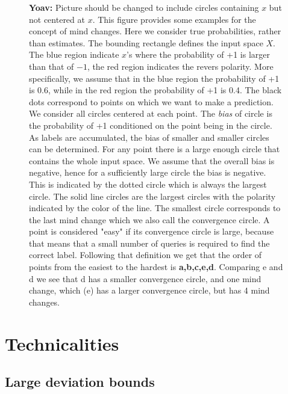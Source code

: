 \documentclass{article}
\newcommand{\yoav}[1]{{\color{blue} {\bf Yoav:} #1}}
\begin{document}
\begin{figure}
\caption{\yoav{Picture should be changed to include circles containing $x$ but not centered at $x$.} This figure provides some examples for the concept of mind changes. Here we consider true probabilities, rather than estimates. The bounding rectangle defines the input space $X$. The blue region indicate $x$'s where the probability of +1 is larger than that of $-1$, the red region indicates the revers polarity. More specifically, we assume that in the blue region the probability of +1 is 0.6, while in the red region the probability of +1 is 0.4.
The black dots correspond to points on which we want to make a prediction. We consider all circles centered at each point. The {\em bias} of  circle is the probability of +1 conditioned on the point being in the circle. As labels are accumulated, the bias of smaller and smaller circles can be determined. For any point there is a large enough circle that contains the whole input space. We assume that the overall bias is negative, hence for a sufficiently large circle the bias is negative. This is indicated by the dotted circle which is always the largest circle. The solid line circles are the largest circles with the polarity indicated by the color of the line. The smallest circle corresponds to the last mind change which we also call the convergence circle.
A point is considered "easy" if its convergence circle is large, because that means that a small number of queries is required to find the correct label.
Following that definition we get that the order of points from the easiest to the hardest is {\bf a,b,c,e,d}. Comparing e and d we see that d has a smaller convergence circle, and one mind change, which (e) has a larger convergence circle, but has 4 mind changes.
}

\label{fig:mind-changes}
\end{figure}

\pagebreak

\section{Technicalities}

\subsection{Large deviation bounds}
\end{document}
